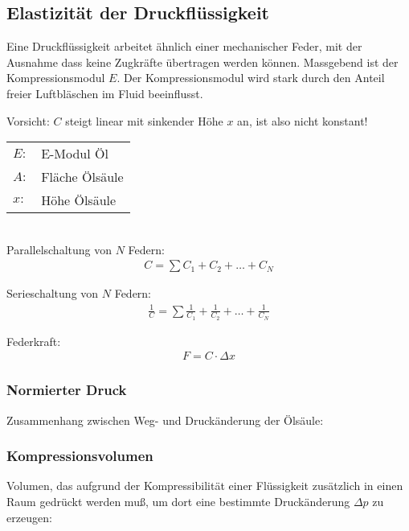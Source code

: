 \documentclass[landscape,a4paper,10pt]{article}
\begin{document}
\begin{multicols*}{3}
\vfill
\columnbreak
\subsection{Elastizität der Druckflüssigkeit}
Eine Druckflüssigkeit arbeitet ähnlich einer mechanischer Feder, mit der Ausnahme dass keine Zugkräfte übertragen werden können. Massgebend ist der Kompressionsmodul $E$. Der Kompressionsmodul wird stark durch den Anteil freier Luftbläschen im Fluid beeinflusst. 

Vorsicht: $C$ steigt linear mit sinkender Höhe $x$ an, ist also nicht konstant!

\begin{tabular}{ll}
$E:$ & E-Modul Öl \\
$A:$ & Fläche Ölsäule \\
$x:$ & Höhe Ölsäule
\end{tabular} \\


Parallelschaltung von $N$ Federn:
\begin{align*}
C = \sum C_1  + C_2 + \hdots + C_N
\end{align*}


Serieschaltung von $N$ Federn:
\begin{align*}
\frac{1}{C} = \sum \frac{1}{C_1} + \frac{1}{C_2} + \hdots + \frac{1}{C_N}
\end{align*}


Federkraft:
\begin{align*}
F = C \cdot \Delta x
\end{align*}




\subsubsection{Normierter Druck}
Zusammenhang zwischen Weg- und Druckänderung der Ölsäule:


\subsubsection{Kompressionsvolumen}
Volumen, das aufgrund der Kompressibilität einer Flüssigkeit zusätzlich in einen Raum gedrückt werden muß, um dort eine bestimmte Druckänderung $\Delta p$ zu erzeugen:


\end{multicols*}
\end{document}
